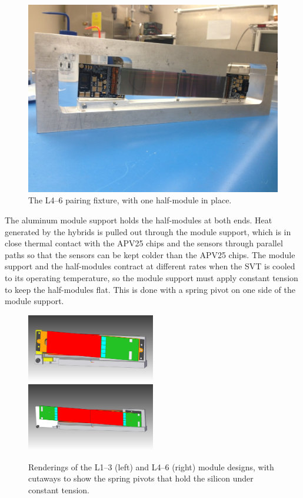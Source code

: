 \begin{figure}[htp]
    \includegraphics[width=\textwidth]{detector/figs/pairing_l456}
    \caption{The L4--6 pairing fixture, with one half-module in place.}
    \label{fig:l456_pairing}
\end{figure}

The aluminum module support holds the half-modules at both ends.
Heat generated by the hybrids is pulled out through the module support, which is in close thermal contact with the APV25 chips and the sensors through parallel paths so that the sensors can be kept colder than the APV25 chips.
The module support and the half-modules contract at different rates when the SVT is cooled to its operating temperature, so the module support must apply constant tension to keep the half-modules flat.
This is done with a spring pivot on one side of the module support.

\begin{figure}[htp]
    \includegraphics[width=0.5\textwidth]{detector/figs/svt_l123_drawing}
    \includegraphics[width=0.5\textwidth]{detector/figs/svt_l456_drawing}
    \caption{Renderings of the L1--3 (left) and L4--6 (right) module designs, with cutaways to show the spring pivots that hold the silicon under constant tension.}
    \label{fig:svt-module-drawing}
\end{figure}

